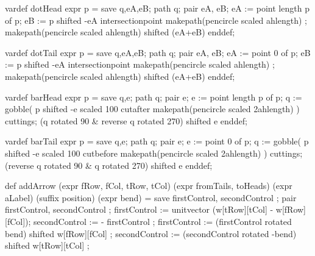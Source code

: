   
  vardef dotHead expr p =
    save q,eA,eB; path q; pair eA, eB;
    eA := point length p of p;
    eB := p shifted -eA intersectionpoint makepath(pencircle scaled ahlength) ;
    makepath(pencircle scaled ahlength) shifted (eA+eB)
  enddef;
  
  vardef dotTail expr p =
    save q,eA,eB; path q; pair eA, eB;
    eA := point 0 of p;
    eB := p shifted -eA intersectionpoint makepath(pencircle scaled ahlength) ;
    makepath(pencircle scaled ahlength) shifted (eA+eB)
  enddef;

  
  vardef barHead expr p =
    save q,e; path q; pair e;
    e := point length p of p;
    q := gobble(
      p shifted -e scaled 100
      cutafter makepath(pencircle scaled 2ahlength)
    ) cuttings;
    (q rotated 90 & reverse q rotated 270) shifted e
  enddef;

  vardef barTail expr p =
    save q,e; path q; pair e;
    e := point 0 of p;
    q := gobble(
      p shifted -e scaled 100
      cutbefore makepath(pencircle scaled 2ahlength)
    ) cuttings;
    (reverse q rotated 90 & q rotated 270) shifted e
  enddef;
  
  def addArrow
    (expr fRow, fCol, tRow, tCol)
    (expr fromTails, toHeads)
    (expr aLabel)
    (suffix position)
    (expr bend) =
    save firstControl, secondControl ; pair firstControl, secondControl ;
    firstControl  := unitvector (w[tRow][tCol] - w[fRow][fCol]);
    secondControl := - firstControl ;
    firstControl  := (firstControl rotated bend) shifted w[fRow][fCol] ;
    secondControl := (secondControl rotated -bend) shifted w[tRow][tCol] ;
    
